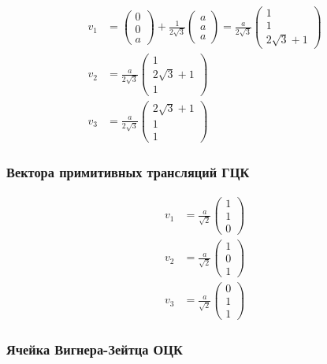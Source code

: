 \documentclass[a4paper, 12pt]{article}
\begin{document}
\begin{align}
	v_1 &= \begin{pmatrix}
		0 \\ 0 \\ a
	\end{pmatrix}
	+ \frac{1}{2\sqrt{3}}\begin{pmatrix}
		a \\ a \\ a
	\end{pmatrix} = \frac{a}{2\sqrt{3}} \begin{pmatrix}
	1 \\ 1 \\ 2\sqrt{3} + 1
\end{pmatrix}\\
	v_2 &= \frac{a}{2\sqrt{3}} \begin{pmatrix}
	1 \\ 2\sqrt{3} + 1 \\ 1
\end{pmatrix}\\
	v_3 &= \frac{a}{2\sqrt{3}} \begin{pmatrix}
		2\sqrt{3} + 1 \\ 1 \\ 1
	\end{pmatrix}
\end{align}

\subsubsection{Вектора примитивных трансляций ГЦК}

\begin{align}
	v_1 &= \frac{a}{\sqrt{2}}\begin{pmatrix}
		1 \\ 1 \\ 0
	\end{pmatrix}\\
	v_2 &= \frac{a}{\sqrt{2}} \begin{pmatrix}
		1 \\ 0 \\ 1
	\end{pmatrix}\\
	v_3 &= \frac{a}{\sqrt{2}} \begin{pmatrix}
		0 \\ 1 \\ 1
	\end{pmatrix}
\end{align}

\subsubsection{Ячейка Вигнера-Зейтца ОЦК}
\end{document}
